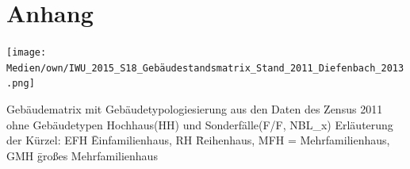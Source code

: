 
\chapter{Anhang}
	\label{sec:anhang}
	
		
		\begin{table}[!h]
			\texttt{[image: Medien/own/IWU\_2015\_S18\_Gebäudestandsmatrix\_Stand\_2011\_Diefenbach\_2013.png]}
			\caption{Gebäudematrix mit Gebäudetypologiesierung aus den Daten des Zensus 2011 ohne Gebäudetypen Hochhaus(HH) und Sonderfälle(F/F, NBL\_x) Erläuterung der Kürzel: EFH \= Einfamilienhaus, RH \= Reihenhaus, MFH = Mehrfamilienhaus, GMH \= großes Mehrfamilienhaus \cite[S.~18]{IWU_2015_Wohngebäudetypologie}}
			\label{tab:Gebäudematrix_2011}
		\end{table}	
			
					
		
		
